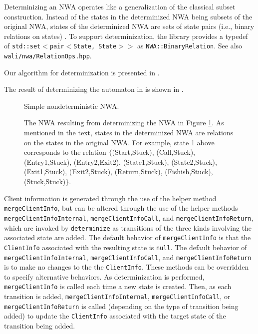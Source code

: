 Determinizing an NWA operates like a
generalization of the classical subset construction.  Instead of the states
in the determinized NWA being subsets of the original NWA, states of the
determinized NWA are sets of state pairs (i.e., binary relations on states)
\cite{JACM:AM2009}.  To support determinization, the library provides a
typedef of \texttt{std::set$<$pair$<$State, State$>>$} as 
\texttt{NWA::BinaryRelation}. See also \texttt{wali/nwa/RelationOps.hpp}.

Our algorithm for determinization is presented in
.



The result of determinizing the automaton in  is shown in
.

\begin{figure}[p]
  \centering
  \caption{Simple nondeterministic NWA.}
  \label{Fi:Det1}
\end{figure}


\begin{figure}[p]
  \centering
    \caption{The NWA resulting from determinizing the NWA in Figure
      \ref{Fi:Det1}. As mentioned in the text, states in the determinized
      NWA are relations on the states in the original NWA. For example, state
      1 above corresponds to the relation $\{$(Start,Stuck), (Call,Stuck),
      (Entry1,Stuck), (Entry2,Exit2), (State1,Stuck), (State2,Stuck),
      (Exit1,Stuck), (Exit2,Stuck), (Return,Stuck), (Fishish,Stuck),
      (Stuck,Stuck)$\}$.}
 
  \label{Fi:Det2}
\end{figure}


Client information is generated through the use of the helper method
\texttt{mergeClientInfo}, but can be altered through the use of the helper
methods \texttt{mergeClientInfoInternal}, \texttt{mergeClientInfoCall}, and
\texttt{mergeClientInfoReturn}, which are invoked by \texttt{determinize} as
transitions of the three kinds involving the associated state are added.  The
default behavior of \texttt{mergeClientInfo} is that the \texttt{ClientInfo}
associated with the resulting state is \texttt{null}.  The default behavior
of \texttt{mergeClientInfoInternal}, \texttt{mergeClientInfoCall}, and
\texttt{mergeClientInfoReturn} is to make no changes to the the
\texttt{ClientInfo}.  These methods can be overridden to specify alternative
behaviors.  As determinization is performed, \texttt{mergeClientInfo} is
called each time a new state is created.  Then, as each transition is added,
\texttt{mergeClientInfoInternal}, \texttt{mergeClientInfoCall}, or
\texttt{mergeClientInfoReturn} is called (depending on the type of transition
being added) to update the \texttt{ClientInfo} associated with the target
state of the transition being added.


